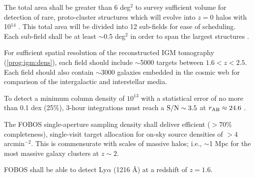 \documentclass[11pt,a4paper,twoside,onecolumn,openany,final,oldfontcommands]{memoir}
\begin{document}
\begin{programrequirement}
\reqitem The total area shall be greater than 6 deg$^2$ to survey sufficient volume for detection of rare, proto-cluster structures which will evolve into $z=0$ halos with 10$^{14}$ \msun{}.  This total area will be divided into 12 sub-fields for ease of scheduling.  Each sub-field shall be at least $\sim$0.5 deg$^2$ in order to span the largest structures \citep[see][]{lee16}.

\reqitem For sufficient spatial resolution of the reconstructed IGM tomography (\ref{prog:igm:dens}), each field should include $\sim$5000 targets between $1.6 < z < 2.5$. 
\reqitem Each field should also contain $\sim$3000 galaxies embedded in the cosmic web for comparison of the intergalactic and interstellar media.

\reqitem To detect a minimum  column density of $10^{13}$  with a statistical error of no more than 0.1 dex (25\%), 3-hour integrations must reach a ${\rm S/N} \sim 3.5$ at $r_{\rm AB} \approx 24.6$ . 

\end{programrequirement}

\medskip
\begin{sciencerequirement}
\reqitem The FOBOS single-aperture sampling density shall deliver efficient ($>70$\% completeness), single-visit target allocation for on-sky source densities of $>$4 arcmin$^{-2}$.  This is commensurate with scales of massive halos; i.e., $\sim$1 Mpc for the most massive galaxy clusters at $z\sim 2$. \label{prog:igm:dens}


\reqitem FOBOS shall be able to detect Ly$\alpha$ (1216 \AA{}) at a redshift of $z=1.6$.  

\end{sciencerequirement}

\end{document}
